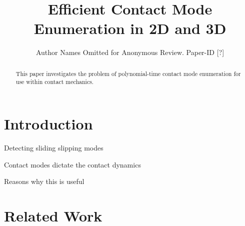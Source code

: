 \documentclass[conference]{IEEEtran}
\begin{document}
\title{\huge Efficient Contact Mode Enumeration in 2D and 3D}

\author{Author Names Omitted for Anonymous Review. Paper-ID [?]}



\maketitle

\begin{abstract}
This paper investigates the problem of polynomial-time contact mode enumeration
for use within contact mechanics.
\end{abstract}
 
\IEEEpeerreviewmaketitle

\section{Introduction}

\begin{inparaenum}
    \item Detecting sliding slipping modes
    \item Contact modes dictate the contact dynamics 
    \item Reasons why this is useful
\end{inparaenum}

\section{Related Work}
\end{document}
